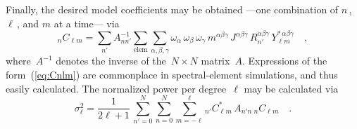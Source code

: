 \documentclass[extra,mreferee]{gji}
\begin{document}
Finally, the desired model coefficients may be obtained ---one combination of $n$\,, $\ell$\,, and $m$ at a time--- via
\begin{equation}
    {}_nC_{\ell m}=\sum_{n'}A^{-1}_{nn'}\sum_{\mathrm{elem}}\sum_{\alpha,\beta,\gamma}\omega_\alpha\,\omega_\beta\,\omega_\gamma\,m^{\alpha\beta\gamma}\,J^{\alpha\beta\gamma}\,R_{n'}^{\alpha\beta\gamma}\,Y_{\ell m}^{*\,\alpha\beta\gamma}
    \quad ,
    \label{eq:Cnlm}
\end{equation}
where~$A^{-1}$ denotes the inverse of the~$N\times N$ matrix~$A$.
Expressions of the form~(\ref{eq:Cnlm}) are commonplace in spectral-element simulations,
and thus easily calculated.
The normalized power per degree~$\ell$ may be calculated via
\begin{equation}
    \sigma_\ell^2=\frac{1}{2\ell+1}\,
    \sum_{n' = 0}^N\sum_{n = 0}^N\sum_{m = -\ell}^\ell{}_{n'}C^*_{\ell m}\,A_{n'n}\,{}_{n}C_{\ell m}
    \quad .
\end{equation}
\end{document}
